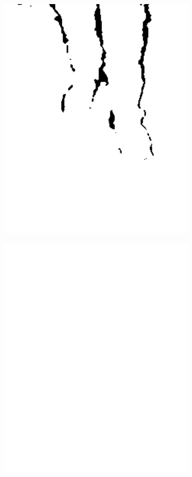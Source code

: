 \documentclass[a4paper]{report}
\begin{document}
\begin{figure}[H]
\centering
\begin{minipage}{.5\textwidth}
  \centering
    \includegraphics[width=0.85\textwidth]{images/building/max_legs.png}
    \label{img:simple_max_legs}
\end{minipage}%
\begin{minipage}{.5\textwidth}
  \centering
    \includegraphics[width=0.85\textwidth]{images/building/max_feet.png}
    \label{img:simple_max_feet}
\end{minipage}%
\end{figure}
\end{document}
